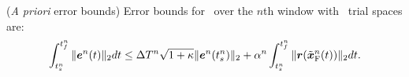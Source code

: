 \begin{theorem}(\textit{A priori} error bounds)\label{theorem:apriori_bound}
Error bounds for \methodAcronymROMs\ over the $n$th window with \spatialAcronym\ trial spaces are:
\begin{equation}\label{eq:apriori_bound}
\int_{t_s^{n}}^{t_f^{n}} \| \boldsymbol e^{n}(t) \|_2 dt \le \Delta T^{n} \sqrt{1 + \kappa} \|  \boldsymbol e^{n}(t_s^{n})   \|_2   + \alpha^{n} \int_{t_s^{n}}^{t_f^{n}} \|  \boldsymbol r(\tilde{\boldsymbol x}_{\text{F}}^{n}(t))  \|_2 dt.
\end{equation}
\end{theorem}
